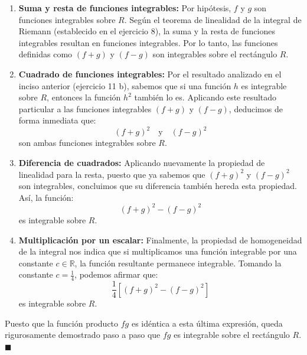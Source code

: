 \documentclass[11pt,letterpaper]{article}
\begin{document}
\begin{enumerate}
    \item \textbf{Suma y resta de funciones integrables:} Por hipótesis, $f$ y $g$ son funciones integrables sobre $R$. Según el teorema de linealidad de la integral de Riemann (establecido en el ejercicio 8), la suma y la resta de funciones integrables resultan en funciones integrables. Por lo tanto, las funciones definidas como $(f+g)$ y $(f-g)$ son integrables sobre el rectángulo $R$.
    
    \item \textbf{Cuadrado de funciones integrables:} Por el resultado analizado en el inciso anterior (ejercicio 11 b), sabemos que si una función $h$ es integrable sobre $R$, entonces la función $h^2$ también lo es. Aplicando este resultado particular a las funciones integrables $(f+g)$ y $(f-g)$, deducimos de forma inmediata que:
    \begin{equation*}
    (f+g)^2 \quad \text{y} \quad (f-g)^2
    \end{equation*}
    son ambas funciones integrables sobre $R$.
    
    \item \textbf{Diferencia de cuadrados:} Aplicando nuevamente la propiedad de linealidad para la resta, puesto que ya sabemos que $(f+g)^2$ y $(f-g)^2$ son integrables, concluimos que su diferencia también hereda esta propiedad. Así, la función:
    \begin{equation*}
    (f+g)^2 - (f-g)^2
    \end{equation*}
    es integrable sobre $R$.
    
    \item \textbf{Multiplicación por un escalar:} Finalmente, la propiedad de homogeneidad de la integral nos indica que si multiplicamos una función integrable por una constante $c \in \mathbb{R}$, la función resultante permanece integrable. Tomando la constante $c = \frac{1}{4}$, podemos afirmar que:
    \begin{equation*}
    \frac{1}{4} \left[ (f+g)^2 - (f-g)^2 \right]
    \end{equation*}
    es integrable sobre $R$.
\end{enumerate}

Puesto que la función producto $fg$ es idéntica a esta última expresión, queda rigurosamente demostrado paso a paso que $fg$ es integrable sobre el rectángulo $R$. \hfill $\blacksquare$

\vspace{0.8cm}
\end{document}
